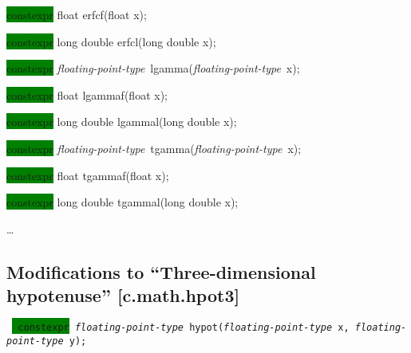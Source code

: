 \documentclass[prd,twocolumn,amsmath,amssymb,nofootinbib,eqsecnum]{revtex4-1}
\newcommand{\code}[1]{{\tt #1}}
\newcommand{\highlight}[1]{\colorbox{green}{\!\!\!\! #1}}
\newcommand{\fptype}{{\it floating-point-type}}
\begin{document}
{\highlight{constexpr} float erfcf(float x);

\highlight{constexpr} long double erfcl(long double x);

\vspace{2ex}


\highlight{constexpr} \fptype\ lgamma(\fptype\ x);

\highlight{constexpr} float lgammaf(float x);

\highlight{constexpr} long double lgammal(long double x);

\vspace{2ex}

\highlight{constexpr} \fptype\ tgamma(\fptype\ x);

\highlight{constexpr} float tgammaf(float x);

\highlight{constexpr} long double tgammal(long double x);

\ldots

}


\subsection{Modifications to ``Three-dimensional hypotenuse''  [c.math.hpot3]}

\code{
	\highlight{constexpr} \fptype\ hypot(\fptype\ x, \fptype\ y);
}
\end{document}
